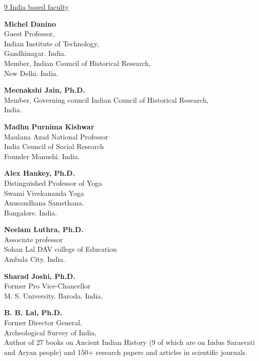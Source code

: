 \newpage

\centerline{\underline{9 India based faculty}} 

\begin{multicols}{2}
\begin{trivlist}
\itemsep=10pt
\item \textbf{Michel Danino}\\ 
Guest Professor,\\ 
Indian Institute of Technology,\\ 
Gandhinagar. India.\\
Member, Indian Council of Historical Research,\\ 
New Delhi. India.

\item \textbf{Meenakshi Jain, Ph.D.}\\ 
Member, Governing council Indian Council of Historical Research,\\
India.
 

\item \textbf{Madhu Purnima Kishwar}\\ 
Maulana Azad National Professor\\
India Council of Social Research\\
Founder Manushi. India.
 
\item \textbf{Alex Hankey, Ph.D.}\\ 
Distinguished Professor of Yoga\\
Swami Vivekananda Yoga\\ Anusandhana Samsthana.\\ 
Bangalore. India.
 
\item \textbf{Neelam Luthra, Ph.D.}\\ 
Associate professor\\
Sohan Lal DAV college of Education\\
Ambala City. India.
 
\item \textbf{Sharad Joshi, Ph.D.}\\ 
Former Pro Vice-Chancellor\\
M. S. University. Baroda. India.

\item \textbf{B. B. Lal, Ph.D.}\\ 
Former Director General,\\ 
Archeological Survey of India,\\
Author of 27 books on Ancient Indian History (9 of which are on Indus Sarasvati and Aryan people) and 150+ research papers and articles in scientific journals. 
 

\end{trivlist}
\end{multicols}
